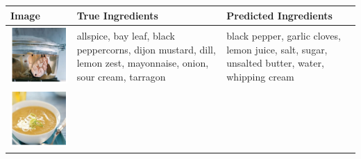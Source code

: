 \documentclass[10pt,twocolumn,letterpaper]{article}
\begin{document}
\begin{table}
    \centering
    \begin{tabular}{|p{5cm}|p{5cm}|p{5cm}|}
        \hline
        Image & True Ingredients & Predicted Ingredients \\
        \hline\hline
        \includegraphics[width=1\linewidth]{pred-1.png} & 
        allspice, bay leaf, black peppercorns, dijon mustard, dill, lemon zest, mayonnaise, onion, sour cream, tarragon &
        black pepper, garlic cloves, lemon juice, salt, sugar, unsalted butter, water, whipping cream \\
        \hline
        \includegraphics[width=1\linewidth]{pred-2.png} & 

\end{tabular}
\end{table}
\end{document}
